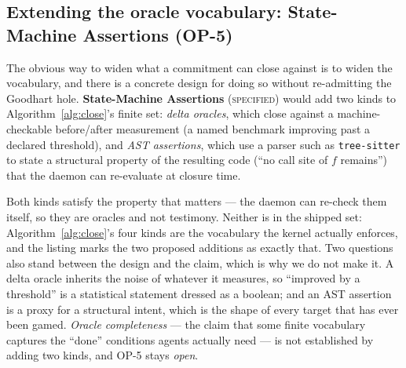 \documentclass[11pt,a4paper]{article}
\newcommand{\Designed}{{\textcolor{hhgray}{\textsc{specified}}}}
\newcommand{\Open}{{\textcolor{hhgray}{\textit{open}}}}
\theoremstyle{definition}
\theoremstyle{remark}
\begin{document}
\subsection{Extending the oracle vocabulary: State-Machine Assertions (OP-5)}

The obvious way to widen what a commitment can close against is to widen the
vocabulary, and there is a concrete design for doing so without re-admitting the
Goodhart hole. \textbf{State-Machine Assertions} (\Designed) would add two kinds to
Algorithm~\ref{alg:close}'s finite set: \emph{delta oracles}, which close against a
machine-checkable before/after measurement (a named benchmark improving past a
declared threshold), and \emph{AST assertions}, which use a parser such as
\texttt{tree-sitter} to state a structural property of the resulting code (``no call
site of $f$ remains'') that the daemon can re-evaluate at closure time.

Both kinds satisfy the property that matters --- the daemon can re-check them
itself, so they are oracles and not testimony. Neither is in the shipped set:
Algorithm~\ref{alg:close}'s four kinds are the vocabulary the kernel actually
enforces, and the listing marks the two proposed additions as exactly that. Two
questions also stand between the design and the claim, which is why we do not make
it. A delta oracle inherits the noise of whatever it measures, so ``improved by a
threshold'' is a statistical statement dressed as a boolean; and an AST assertion is
a proxy for a structural intent, which is the shape of every target that has ever
been gamed. \emph{Oracle completeness} --- the claim that some finite vocabulary
captures the ``done'' conditions agents actually need --- is not established by
adding two kinds, and OP-5 stays \Open{}.
\end{document}
